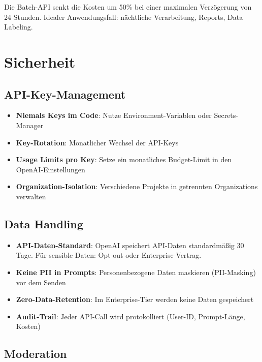 Die Batch-API senkt die Kosten um 50\% bei einer maximalen Verzögerung von 24 Stunden. Idealer Anwendungsfall: nächtliche Verarbeitung, Reports, Data Labeling.

\section{Sicherheit}

\subsection{API-Key-Management}

\begin{itemize}[leftmargin=*]
    \item \textbf{Niemals Keys im Code}: Nutze Environment-Variablen oder Secrets-Manager
    \item \textbf{Key-Rotation}: Monatlicher Wechsel der API-Keys
    \item \textbf{Usage Limits pro Key}: Setze ein monatliches Budget-Limit in den OpenAI-Einstellungen
    \item \textbf{Organization-Isolation}: Verschiedene Projekte in getrennten Organizations verwalten
\end{itemize}

\subsection{Data Handling}

\begin{itemize}[leftmargin=*]
    \item \textbf{API-Daten-Standard}: OpenAI speichert API-Daten standardmäßig 30 Tage. Für sensible Daten: Opt-out oder Enterprise-Vertrag.
    \item \textbf{Keine PII in Prompts}: Personenbezogene Daten maskieren (PII-Masking) vor dem Senden
    \item \textbf{Zero-Data-Retention}: Im Enterprise-Tier werden keine Daten gespeichert
    \item \textbf{Audit-Trail}: Jeder API-Call wird protokolliert (User-ID, Prompt-Länge, Kosten)
\end{itemize}

\subsection{Moderation}

